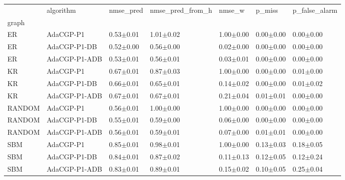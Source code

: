 \begin{tabular}{lllllll}
\toprule
 & algorithm & nmse_pred & nmse_pred_from_h & nmse_w & p_miss & p_false_alarm \\
graph &  &  &  &  &  &  \\
\midrule
ER & AdaCGP-P1 & 0.53{\scriptsize$\pm$0.01} & 1.01{\scriptsize$\pm$0.02} & 1.00{\scriptsize$\pm$0.00} & 0.00{\scriptsize$\pm$0.00} & 0.00{\scriptsize$\pm$0.00} \\
ER & AdaCGP-P1-DB & 0.52{\scriptsize$\pm$0.00} & 0.56{\scriptsize$\pm$0.00} & 0.02{\scriptsize$\pm$0.00} & 0.00{\scriptsize$\pm$0.00} & 0.00{\scriptsize$\pm$0.00} \\
ER & AdaCGP-P1-ADB & 0.53{\scriptsize$\pm$0.01} & 0.56{\scriptsize$\pm$0.01} & 0.03{\scriptsize$\pm$0.01} & 0.00{\scriptsize$\pm$0.00} & 0.00{\scriptsize$\pm$0.00} \\
KR & AdaCGP-P1 & 0.67{\scriptsize$\pm$0.01} & 0.87{\scriptsize$\pm$0.03} & 1.00{\scriptsize$\pm$0.00} & 0.00{\scriptsize$\pm$0.00} & 0.01{\scriptsize$\pm$0.00} \\
KR & AdaCGP-P1-DB & 0.66{\scriptsize$\pm$0.01} & 0.65{\scriptsize$\pm$0.01} & 0.14{\scriptsize$\pm$0.02} & 0.00{\scriptsize$\pm$0.00} & 0.01{\scriptsize$\pm$0.02} \\
KR & AdaCGP-P1-ADB & 0.67{\scriptsize$\pm$0.01} & 0.67{\scriptsize$\pm$0.01} & 0.21{\scriptsize$\pm$0.04} & 0.01{\scriptsize$\pm$0.01} & 0.00{\scriptsize$\pm$0.00} \\
RANDOM & AdaCGP-P1 & 0.56{\scriptsize$\pm$0.01} & 1.00{\scriptsize$\pm$0.00} & 1.00{\scriptsize$\pm$0.00} & 0.00{\scriptsize$\pm$0.00} & 0.00{\scriptsize$\pm$0.00} \\
RANDOM & AdaCGP-P1-DB & 0.55{\scriptsize$\pm$0.01} & 0.59{\scriptsize$\pm$0.00} & 0.06{\scriptsize$\pm$0.00} & 0.00{\scriptsize$\pm$0.00} & 0.00{\scriptsize$\pm$0.00} \\
RANDOM & AdaCGP-P1-ADB & 0.56{\scriptsize$\pm$0.01} & 0.59{\scriptsize$\pm$0.01} & 0.07{\scriptsize$\pm$0.00} & 0.01{\scriptsize$\pm$0.01} & 0.00{\scriptsize$\pm$0.00} \\
SBM & AdaCGP-P1 & 0.85{\scriptsize$\pm$0.01} & 0.98{\scriptsize$\pm$0.01} & 1.00{\scriptsize$\pm$0.00} & 0.13{\scriptsize$\pm$0.03} & 0.18{\scriptsize$\pm$0.05} \\
SBM & AdaCGP-P1-DB & 0.84{\scriptsize$\pm$0.01} & 0.87{\scriptsize$\pm$0.02} & 0.11{\scriptsize$\pm$0.13} & 0.12{\scriptsize$\pm$0.05} & 0.12{\scriptsize$\pm$0.24} \\
SBM & AdaCGP-P1-ADB & 0.83{\scriptsize$\pm$0.01} & 0.89{\scriptsize$\pm$0.01} & 0.15{\scriptsize$\pm$0.02} & 0.10{\scriptsize$\pm$0.05} & 0.25{\scriptsize$\pm$0.04} \\

\end{tabular}
